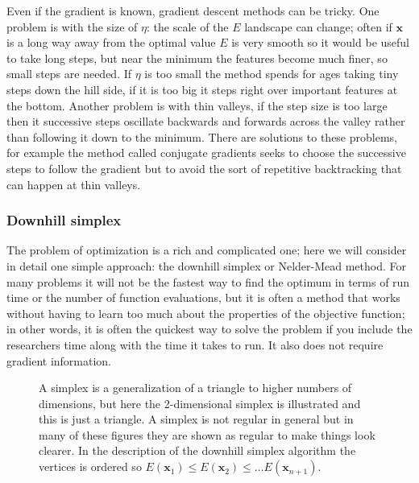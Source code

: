 \documentclass[11pt,a4paper]{scrartcl}
\begin{document}
Even if the gradient is known, gradient descent methods can be
tricky. One problem is with the size of $\eta$: the scale of the $E$
landscape can change; often if $\mathbf{x}$ is a long way away from
the optimal value $E$ is very smooth so it would be useful to take
long steps, but near the minimum the features become much finer, so
small steps are needed. If $\eta$ is too small the method spends for
ages taking tiny steps down the hill side, if it is too big it steps
right over important features at the bottom. Another problem is with
thin valleys, if the step size is too large then it successive steps
oscillate backwards and forwards across the valley rather than
following it down to the minimum. There are solutions to these
problems, for example the method called conjugate gradients seeks to
choose the successive steps to follow the gradient but to avoid the
sort of repetitive backtracking that can happen at thin valleys.

\subsubsection*{Downhill simplex}

The problem of optimization is a rich and complicated one; here we
will consider in detail one simple approach: the downhill simplex or
Nelder-Mead method. For many problems it will not be the fastest way
to find the optimum in terms of run time or the number of function
evaluations, but it is often a method that works without having to
learn too much about the properties of the objective function; in
other words, it is often the quickest way to solve the problem if you
include the researchers time along with the time it takes to run. It
also does not require gradient information.


\begin{figure}
\begin{center}
\end{center}
\caption{A simplex is a generalization of a triangle to higher numbers
  of dimensions, but here the 2-dimensional simplex is illustrated and
  this is just a triangle. A simplex is not regular in general but in
  many of these figures they are shown as regular to make things look
  clearer. In the description of the downhill simplex algorithm the
  vertices is ordered so $E(\mathbf{x}_1)\le E(\mathbf{x}_2)\le \ldots
  E(\mathbf{x}_{n+1})$.\label{fig:simplex}}
\end{figure}
\end{document}
